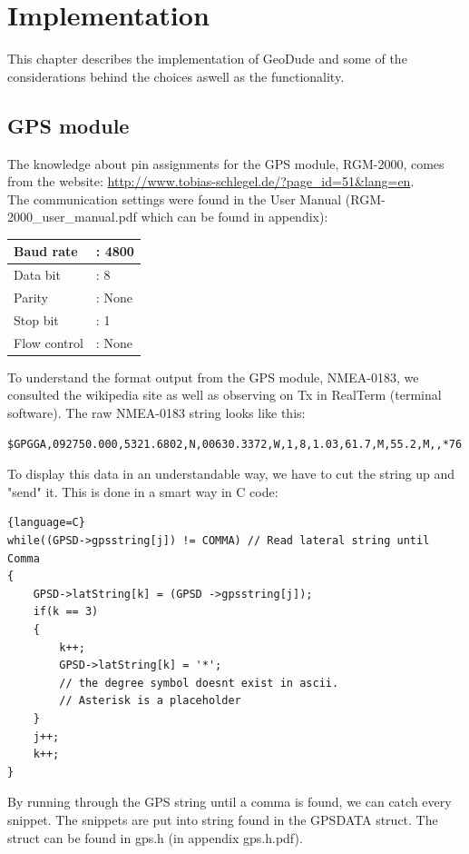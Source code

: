 \chapter{Implementation}
This chapter describes the implementation of GeoDude and some of the considerations behind the choices aswell as the functionality.

\section{GPS module}
The knowledge about pin assignments for the GPS module, RGM-2000, comes from the website: \url{http://www.tobias-schlegel.de/?page_id=51&lang=en}.\\ 
The communication settings were found in the User Manual (RGM-2000\_user\_manual.pdf which can be found in appendix):\\
\begin{table}[H]
    \begin{tabular}{|ll|}
    \hline
    Baud rate    & : 4800 \\ \hline
    Data bit     & : 8    \\ \hline
    Parity       & : None \\ \hline
    Stop bit     & : 1    \\ \hline
    Flow control & : None \\ \hline
    \end{tabular}
\end{table}
To understand the format output from the GPS module, NMEA-0183, we consulted the wikipedia site as well as observing on Tx in RealTerm (terminal software). The raw NMEA-0183 string looks like this:\\
\begin{verbatim}
$GPGGA,092750.000,5321.6802,N,00630.3372,W,1,8,1.03,61.7,M,55.2,M,,*76
\end{verbatim}
To display this data in an understandable way, we have to cut the string up and "send" it. This is done in a smart way in C code:\\
\begin{lstlisting}{language=C}
while((GPSD->gpsstring[j]) != COMMA) // Read lateral string until Comma
{
	GPSD->latString[k] = (GPSD ->gpsstring[j]);
	if(k == 3)
	{
		k++;
		GPSD->latString[k] = '*';   
		// the degree symbol doesnt exist in ascii. 
		// Asterisk is a placeholder
	}
	j++;
	k++;
}
\end{lstlisting}
By running through the GPS string until a comma is found, we can catch every snippet. The snippets are put into string found in the GPSDATA struct. The struct can be found in gps.h (in appendix gps.h.pdf).


